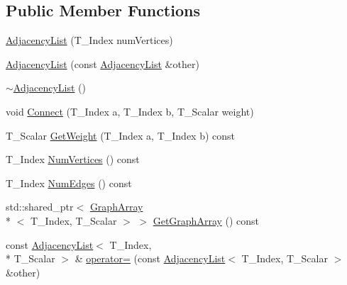 \subsection*{Public Member Functions}
\begin{DoxyCompactItemize}
\item 
\hyperlink{class_undirected_weighted_graph_1_1_adjacency_list_a1a7c702a7ccd8ef53d155076961134cc}{Adjacency\+List} (T\+\_\+\+Index num\+Vertices)
\item 
\hyperlink{class_undirected_weighted_graph_1_1_adjacency_list_aec4427408ab6b840b2005e7e0273581d}{Adjacency\+List} (const \hyperlink{class_undirected_weighted_graph_1_1_adjacency_list}{Adjacency\+List} \&other)
\item 
\hyperlink{class_undirected_weighted_graph_1_1_adjacency_list_acb6a788f835b7b7417087b05c9932d64}{$\sim$\+Adjacency\+List} ()
\item 
void \hyperlink{class_undirected_weighted_graph_1_1_adjacency_list_a81740f79eb43d5904bc52944af0fe8ad}{Connect} (T\+\_\+\+Index a, T\+\_\+\+Index b, T\+\_\+\+Scalar weight)
\item 
T\+\_\+\+Scalar \hyperlink{class_undirected_weighted_graph_1_1_adjacency_list_a1de7ba4f3959d823bc4b3ce64335125f}{Get\+Weight} (T\+\_\+\+Index a, T\+\_\+\+Index b) const 
\item 
T\+\_\+\+Index \hyperlink{class_undirected_weighted_graph_1_1_adjacency_list_aa03bb66b3afd825e693edbedd77107db}{Num\+Vertices} () const 
\item 
T\+\_\+\+Index \hyperlink{class_undirected_weighted_graph_1_1_adjacency_list_a99e7675fa390f607b997774f82d90e3d}{Num\+Edges} () const 
\item 
std\+::shared\+\_\+ptr$<$ \hyperlink{struct_undirected_weighted_graph_1_1_graph_array}{Graph\+Array}\\*
$<$ T\+\_\+\+Index, T\+\_\+\+Scalar $>$ $>$ \hyperlink{class_undirected_weighted_graph_1_1_adjacency_list_a5abf86d74fe0bf2c56bd88c18714104b}{Get\+Graph\+Array} () const 
\item 
const \hyperlink{class_undirected_weighted_graph_1_1_adjacency_list}{Adjacency\+List}$<$ T\+\_\+\+Index, \\*
T\+\_\+\+Scalar $>$ \& \hyperlink{class_undirected_weighted_graph_1_1_adjacency_list_a516dec9b2d05da8c64380e6e2a73befa}{operator=} (const \hyperlink{class_undirected_weighted_graph_1_1_adjacency_list}{Adjacency\+List}$<$ T\+\_\+\+Index, T\+\_\+\+Scalar $>$ \&other)
\end{DoxyCompactItemize}
